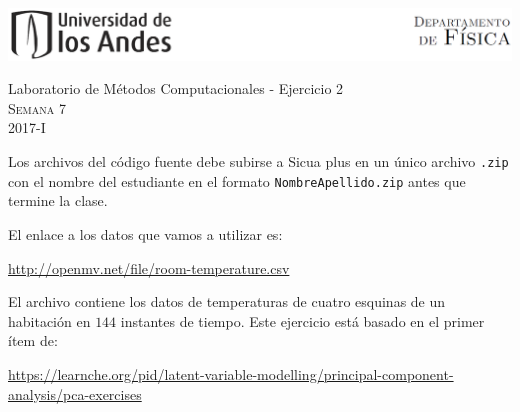 \documentclass[11pt,letterpaper]{exam}
\begin{document}
\begin{center}

\includegraphics[width=16cm]{header.png}

\vspace{1.0cm}
{\Large Laboratorio de M\'etodos Computacionales - Ejercicio 2} \\
\textsc{Semana 7}\\
2017-I\\
\end{center}



\vspace{0.5cm}

\noindent
Los archivos del c\'odigo fuente debe subirse a Sicua plus en un \'unico archivo \verb'.zip' con el nombre del estudiante en el formato \verb"NombreApellido.zip" antes que termine la clase.

El enlace a los datos que vamos a utilizar es:

\url{http://openmv.net/file/room-temperature.csv}

El archivo contiene los datos de temperaturas de cuatro esquinas de un habitaci\'on en $144$ instantes de tiempo. Este ejercicio est\'a basado en el primer \'item de:

\url{https://learnche.org/pid/latent-variable-modelling/principal-component-analysis/pca-exercises}

\vspace{0.5cm}
\end{document}
